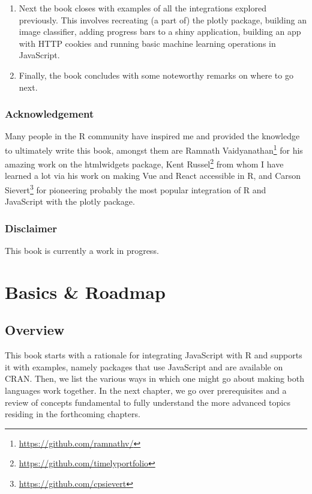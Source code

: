 \documentclass[
]{krantz}
\renewcommand{\href}[2]{#2\footnote{\url{#1}}}
\begin{document}
\begin{enumerate}
\item
  Next the book closes with examples of all the integrations explored previously. This involves recreating (a part of) the plotly package, building an image classifier, adding progress bars to a shiny application, building an app with HTTP cookies and running basic machine learning operations in JavaScript.
\item
  Finally, the book concludes with some noteworthy remarks on where to go next.
\end{enumerate}

\hypertarget{acknowledgement}{%
\section*{Acknowledgement}\label{acknowledgement}}


Many people in the R community have inspired me and provided the knowledge to ultimately write this book, amongst them are \href{https://github.com/ramnathv/}{Ramnath Vaidyanathan} for his amazing work on the htmlwidgets \citep{R-htmlwidgets} package, \href{https://github.com/timelyportfolio}{Kent Russel} from whom I have learned a lot via his work on making Vue and React accessible in R, and \href{https://github.com/cpsievert}{Carson Sievert} for pioneering probably the most popular integration of R and JavaScript with the plotly \citep{R-plotly} package.

\hypertarget{disclaimer}{%
\section*{Disclaimer}\label{disclaimer}}


This book is currently a work in progress.

\mainmatter

\hypertarget{part-basics-roadmap}{%
\part{Basics \& Roadmap}\label{part-basics-roadmap}}

\hypertarget{overview}{%
\chapter{Overview}\label{overview}}

This book starts with a rationale for integrating JavaScript with R and supports it with examples, namely packages that use JavaScript and are available on CRAN. Then, we list the various ways in which one might go about making both languages work together. In the next chapter, we go over prerequisites and a review of concepts fundamental to fully understand the more advanced topics residing in the forthcoming chapters.
\end{document}
